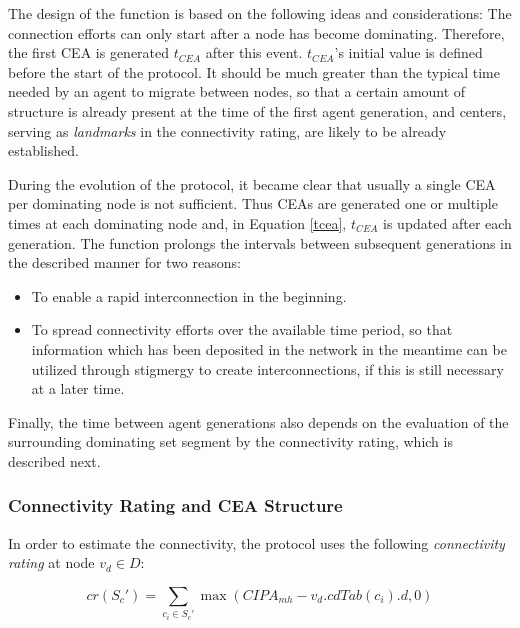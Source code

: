 The design of the function is based on the following ideas and considerations: The connection efforts can only start after a node has become dominating. Therefore, the first CEA is generated $t_{CEA}$ after this event. $t_{CEA}$'s initial value is defined before the start of the protocol. It should be much greater than the typical time needed by an agent to migrate between nodes, so that a certain amount of structure is already present at the time of the first agent generation, and centers, serving as \emph{landmarks} in the connectivity rating, are likely to be already established. 

During the evolution of the protocol, it became clear that usually a single CEA per dominating node is not sufficient. Thus CEAs are generated one or multiple times at each dominating node and, in Equation \ref{tcea}, $t_{CEA}$ is updated after each generation. The function prolongs the intervals between subsequent generations in the described manner for two reasons: 

\begin{itemize}

	\item To enable a rapid interconnection in the beginning. 
	
	\item To spread connectivity efforts over the available time period, so that information which has been deposited in the network in the meantime can be utilized through stigmergy to create interconnections, if this is still necessary at a later time. 
	
\end{itemize}
	
Finally, the time between agent generations also depends on the evaluation of the surrounding dominating set segment by the connectivity rating, which is described next.

\subsubsection{Connectivity Rating and CEA Structure}\label{sec_cr}

In order to estimate the connectivity, the protocol uses the following \emph{connectivity rating} at node $v_d\in D$:

\begin{equation}\label{cr}\label{eq_crsc}
  cr(S_c') = \sum_{c_i \in S_c'}{\max{(CIPA_{mh} - v_d.cdTab(c_i).d,0)}}
\end{equation}

